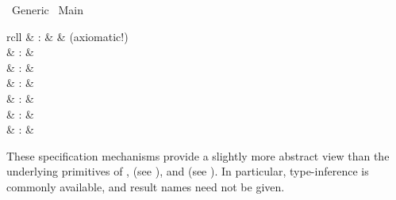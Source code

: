 %
\begin{isabellebody}%
\def\isabellecontext{Generic}%
%
\isadelimtheory
\isanewline
\isanewline
%
\endisadelimtheory
%
\isatagtheory
{}\isamarkupfalse%
\ Generic\isanewline
{}\ Main\isanewline
{}%
\endisatagtheory
{\isafoldtheory}%
%
\isadelimtheory
%
\endisadelimtheory
%
\isamarkuptrue%
%
\isamarkuptrue%
%
\isamarkuptrue%
%
\begin{isamarkuptext}%
\begin{matharray}{rcll}
    \hypertarget{command.axiomatization}{\hyperlink{command.axiomatization}{\mbox{}}} & : &  & (axiomatic!)\\
    \hypertarget{command.definition}{\hyperlink{command.definition}{\mbox{}}} & : &  \\
    \hypertarget{attribute.defn}{\hyperlink{attribute.defn}{\mbox{}}} & : & \isaratt \\
    \hypertarget{command.abbreviation}{\hyperlink{command.abbreviation}{\mbox{}}} & : &  \\
    \hypertarget{command.print_abbrevs}{\hyperlink{command.print_abbrevs}{\mbox{}}}\isa{{\isachardoublequote}\isactrlsup {\isacharasterisk}{\isachardoublequote}} & : &  \\
    \hypertarget{command.notation}{\hyperlink{command.notation}{\mbox{}}} & : &  \\
    \hypertarget{command.no_notation}{\hyperlink{command.no_notation}{\mbox{}}} & : &  \\
  \end{matharray}

  These specification mechanisms provide a slightly more abstract view
  than the underlying primitives of \hyperlink{command.consts}{\mbox{}}, \hyperlink{command.defs}{\mbox{}} (see ), and \hyperlink{command.axioms}{\mbox{}} (see
  ).  In particular, type-inference is commonly
  available, and result names need not be given.


\end{isamarkuptext}
\end{isabellebody}
